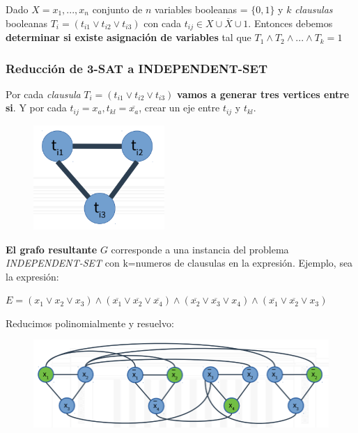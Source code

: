 \documentclass{article}
\begin{document}
Dado \(X={x_1,...,x_n}\) conjunto de \(n\) variables booleanas = \(\{0,1\}\) y 
\(k\) \textit{clausulas} booleanas \(T_i=(t_{i1} \lor t_{i2} \lor t_{i3} )\) 
con cada \(t_{ij} \in X \cup \overline{X} \cup {1}\). Entonces debemos 
\textbf{determinar si existe asignación de variables} tal que \(T_1 \land T_2 \land ... \land T_k = 1\)

\newpage
\subsubsection{Reducción de 3-SAT a INDEPENDENT-SET}
Por cada \textit{clausula} \(T_i=(t_{i1} \lor t_{i2} \lor t_{i3} )\) \textbf{vamos a generar tres vertices entre si}.
Y por cada \(t_{ij}=x_a,t_{kl}=\overline{x_a} \), crear un eje entre \(t_{ij}\) y \(t_{kl}\).

\begin{figure}[h!]
    \includegraphics[scale=0.4]{imagenes/reduccion-3sat.png}
\end{figure}

\textbf{El grafo resultante }\(G\) corresponde a una instancia del problema \textit{INDEPENDENT-SET} 
con k=numeros de clausulas en la expresión. Ejemplo, sea la expresión:

\(E=(x_1 \lor x_2 \lor x_3) \land (\overline{x_1} \lor \overline{x_2} \lor \overline{x_4}) 
    \land (\overline{x_2} \lor \overline{x_3} \lor x_4) 
    \land (\overline{x_1} \lor \overline{x_2} \lor x_3)\)

Reducimos polinomialmente y resuelvo:
\begin{figure}[h!]
    \includegraphics[scale=0.4]{imagenes/ejemplo-reduccion-3sat.png}
\end{figure}
\end{document}
